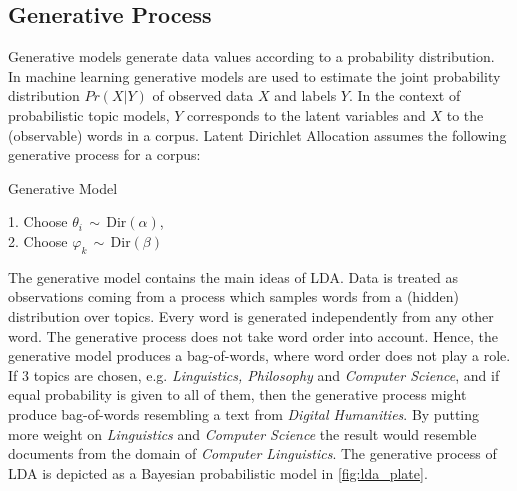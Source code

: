 \documentclass[a4paper,ngerman, english]{atseminar}
\begin{document}
\subsection{Generative Process}
Generative models generate data values according to a probability distribution. In machine learning
generative models are used to estimate the joint probability distribution $Pr(X | Y)$ of observed data $X$
and labels $Y$. In the context of probabilistic topic models, $Y$ corresponds to the latent variables and $X$
to the (observable) words in a corpus.
Latent Dirichlet Allocation assumes the following generative process for
a corpus: \\

\begin{algorithm}[H]
\caption{Generative Model}
1. Choose $ \theta_i \, \sim \, \mathrm{Dir}(\alpha) $,  \\
2. Choose $ \varphi_k \, \sim \, \mathrm{Dir}(\beta) $ \\
\end{algorithm}
\vspace{1.5cm}

The generative model contains the main ideas of LDA. Data is treated as observations
coming from a process which samples words from a (hidden) distribution over topics.
Every word is generated independently from any other word. The generative process
does not take word order into account. Hence, the generative model produces a
bag-of-words, where word order does not play a role. \\
If $3$ topics are chosen, e.g. \textit{Linguistics, Philosophy} and \textit{Computer Science}, and if 
equal probability is given to all of them, then the generative process might produce 
bag-of-words resembling a text from \textit{Digital Humanities}. By putting more weight 
on \textit{Linguistics} and \textit{Computer Science} the result would resemble 
documents from the domain of \textit{Computer Linguistics}.
The generative process of LDA is depicted as a Bayesian probabilistic model in \autoref{fig:lda_plate}.
\end{document}
